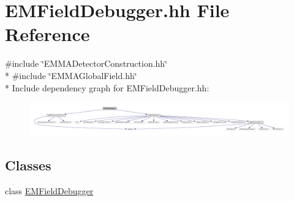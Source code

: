 \hypertarget{EMFieldDebugger_8hh}{}\section{E\+M\+Field\+Debugger.\+hh File Reference}
\label{EMFieldDebugger_8hh}
{\ttfamily \#include \char`\"{}E\+M\+M\+A\+Detector\+Construction.\+hh\char`\"{}}\\*
{\ttfamily \#include \char`\"{}E\+M\+M\+A\+Global\+Field.\+hh\char`\"{}}\\*
Include dependency graph for E\+M\+Field\+Debugger.\+hh\+:
\nopagebreak
\begin{figure}[H]
\begin{center}
\leavevmode
\includegraphics[width=350pt]{EMFieldDebugger_8hh__incl}
\end{center}
\end{figure}
\subsection*{Classes}
\begin{DoxyCompactItemize}
\item 
class \hyperlink{classEMFieldDebugger}{E\+M\+Field\+Debugger}
\end{DoxyCompactItemize}

